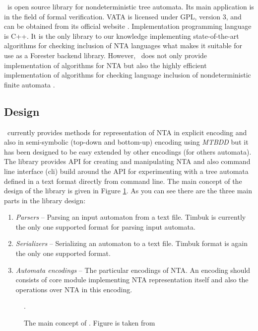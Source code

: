 \Vata\ is open source library for nondeterministic tree automata.
Its main application is in the field of formal verification.
VATA is licensed under GPL, version 3, and can be obtained from its official website \cite{www:libvata}.
Implementation programming language is C++.
It is the only library to our knowledge implementing state-of-the-art algorithms for checking inclusion of NTA languages
what makes it suitable for use as a Forester backend library.
However, \vata\ does not only provide implementation of algorithms for NTA but also the highly efficient implementation of
algorithms for checking language inclusion of nondeterministic finite automata \cite{bt:hruska}.

\subsection{Design}
\Vata\ currently provides methods for representation of NTA in explicit encoding and also in semi-symbolic (top-down and bottom-up)
encoding using \emph{MTBDD} but it has been designed to be easy extended by other encodings (for others automata).
The library provides API for creating and manipulating NTA and also command line interface (cli) build around
the API for experimenting with a tree automata defined in a text format directly from command line.
The main concept of the design of the library is given in Figure \ref{fig:vata}.
As you can see there are the three main parts in the library design:
\begin{enumerate}
	\item \emph{Parsers} -- Parsing an input automaton from a text file.
		Timbuk \cite{timbuk} is currently the only one supported format for parsing input automata.
	\item \emph{Serializers} -- Serializing an automaton to a text file.
		Timbuk format is again the only one supported format.
	\item \emph{Automata encodings} -- The particular encodings of NTA.
		An encoding should consists of core module implementing NTA representation itself
		and also the operations over NTA in this encoding.
\end{enumerate}

\begin{figure}[bt]
\begin{center}

		\caption{The main concept of \vata. Figure is taken from \cite{libvata}}.
		\label{fig:vata}
\end{center}
\end{figure}

